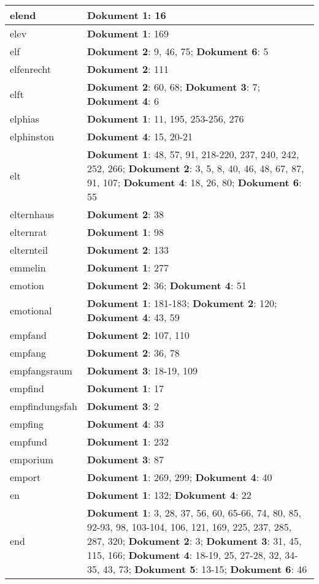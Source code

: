 \documentclass[a5paper]{article}
\begin{document}
\begin{longtable}[l]{|l|p{3in}|}
\hline
elend & \textbf{Dokument 1}: 16 \\
\hline
elev & \textbf{Dokument 1}: 169 \\
\hline
elf & \textbf{Dokument 2}: 9, 46, 75; \textbf{Dokument 6}: 5 \\
\hline
elfenrecht & \textbf{Dokument 2}: 111 \\
\hline
elft & \textbf{Dokument 2}: 60, 68; \textbf{Dokument 3}: 7; \textbf{Dokument 4}: 6 \\
\hline
elphias & \textbf{Dokument 1}: 11, 195, 253-256, 276 \\
\hline
elphinston & \textbf{Dokument 4}: 15, 20-21 \\
\hline
elt & \textbf{Dokument 1}: 48, 57, 91, 218-220, 237, 240, 242, 252, 266; \textbf{Dokument 2}: 3, 5, 8, 40, 46, 48, 67, 87, 91, 107; \textbf{Dokument 4}: 18, 26, 80; \textbf{Dokument 6}: 55 \\
\hline
elternhaus & \textbf{Dokument 2}: 38 \\
\hline
elternrat & \textbf{Dokument 1}: 98 \\
\hline
elternteil & \textbf{Dokument 2}: 133 \\
\hline
emmelin & \textbf{Dokument 1}: 277 \\
\hline
emotion & \textbf{Dokument 2}: 36; \textbf{Dokument 4}: 51 \\
\hline
emotional & \textbf{Dokument 1}: 181-183; \textbf{Dokument 2}: 120; \textbf{Dokument 4}: 43, 59 \\
\hline
empfand & \textbf{Dokument 2}: 107, 110 \\
\hline
empfang & \textbf{Dokument 2}: 36, 78 \\
\hline
empfangsraum & \textbf{Dokument 3}: 18-19, 109 \\
\hline
empfind & \textbf{Dokument 1}: 17 \\
\hline
empfindungsfah & \textbf{Dokument 3}: 2 \\
\hline
empfing & \textbf{Dokument 4}: 33 \\
\hline
empfund & \textbf{Dokument 1}: 232 \\
\hline
emporium & \textbf{Dokument 3}: 87 \\
\hline
emport & \textbf{Dokument 1}: 269, 299; \textbf{Dokument 4}: 40 \\
\hline
en & \textbf{Dokument 1}: 132; \textbf{Dokument 4}: 22 \\
\hline
end & \textbf{Dokument 1}: 3, 28, 37, 56, 60, 65-66, 74, 80, 85, 92-93, 98, 103-104, 106, 121, 169, 225, 237, 285, 287, 320; \textbf{Dokument 2}: 3; \textbf{Dokument 3}: 31, 45, 115, 166; \textbf{Dokument 4}: 18-19, 25, 27-28, 32, 34-35, 43, 73; \textbf{Dokument 5}: 13-15; \textbf{Dokument 6}: 46 \\

\end{longtable}
\end{document}

